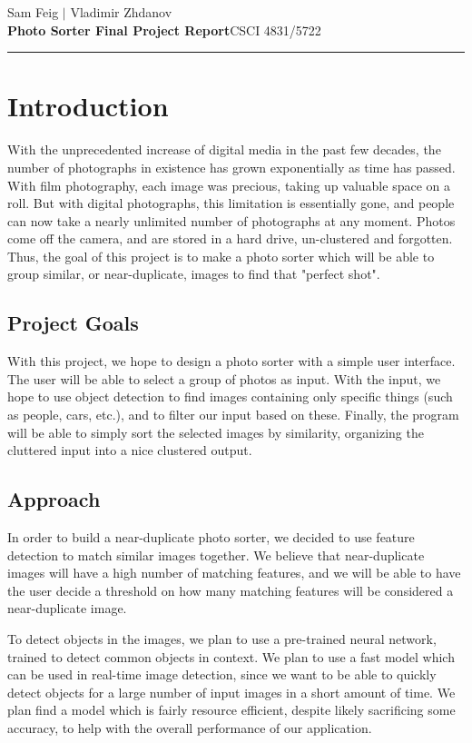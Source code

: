 \documentclass[12pt]{article}
\begin{document}
\hfill Sam Feig $|$ Vladimir Zhdanov \\
\textbf{Photo Sorter Final Project Report}\hfill CSCI 4831/5722 \\
\rule{\textwidth}{.75pt}

\section{Introduction}
	With the unprecedented increase of digital media in the past few decades, the number of photographs in existence has grown exponentially as time has passed. With film photography, each image was precious, taking up valuable space on a roll. But with digital photographs, this limitation is essentially gone, and people can now take a nearly unlimited number of photographs at any moment. Photos come off the camera, and are stored in a hard drive, un-clustered and forgotten. Thus, the goal of this project is to make a photo sorter which will be able to group similar, or near-duplicate, images to find that "perfect shot".

\subsection{Project Goals}
	With this project, we hope to design a photo sorter with a simple user interface. The user will be able to select a group of photos as input. With the input, we hope to use object detection to find images containing only specific things (such as people, cars, etc.), and to filter our input based on these. Finally, the program will be able to simply sort the selected images by similarity, organizing the cluttered input into a nice clustered output.

\subsection{Approach}
	In order to build a near-duplicate photo sorter, we decided to use feature detection to match similar images together. We believe that near-duplicate images will have a high number of matching features, and we will be able to have the user decide a threshold on how many matching features will be considered a near-duplicate image. 
	
	To detect objects in the images, we plan to use a pre-trained neural network, trained to detect common objects in context. We plan to use a fast model which can be used in real-time image detection, since we want to be able to quickly detect objects for a large number of input images in a short amount of time. We plan find a model which is fairly resource efficient, despite likely sacrificing some accuracy, to help with the overall performance of our application.
	
\end{document}
